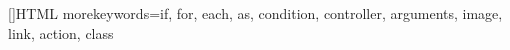 []{HTML} {
    morekeywords={if, for, each, as, condition, controller, arguments, image, link, action, class}
}

\usepackage[final]{pdfpages}

\usepackage{ragged2e}
\usepackage{lscape}
\usepackage{filecontents}

\usepackage{ifthen}
\usepackage{forloop}
\usepackage{todonotes}
\usepackage{xspace}
